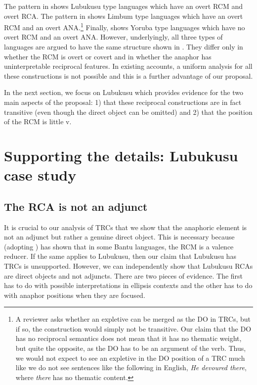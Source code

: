 \documentclass[output=paper]{langsci/langscibook}
\begin{document}
The pattern in  shows Lubukusu type languages which have an overt RCM and overt RCA. The pattern in  shows Limbum type languages which have an overt RCM and an overt ANA.\footnote{ A reviewer asks whether an expletive can be merged as the DO in TRCs, but if so, the construction would simply not be transitive. Our claim that the DO has no reciprocal semantics does not mean that it has no thematic weight, but quite the opposite, as the DO has to be an argument of the verb. Thus, we would not expect to see an expletive in the DO position of a TRC much like we do not see sentences like the following in English, \textit{He devoured there}, where \textit{there} has no thematic content.}   Finally,  shows Yoruba type languages which have no overt RCM and an overt ANA. However, underlyingly, all three types of languages are argued to have the same structure shown in . They differ only in whether the RCM is overt or covert and in whether the anaphor has uninterpretable reciprocal features.  In existing accounts, a uniform analysis for all these constructions is not possible and this is a further advantage of our proposal. 

  In the next section, we focus on Lubukusu which provides evidence for the two main aspects of the proposal: 1) that these reciprocal constructions are in fact transitive (even though the direct object can be omitted) and 2) that the position of the RCM is little v.

\section{Supporting the details: Lubukusu case study}
\subsection{The RCA is not an adjunct}

  It is crucial to our analysis of TRCs that we show that the anaphoric element is not an adjunct but rather a genuine direct object. This is necessary because \citet{Mchombo1994} (adopting \citealt{ReinhartReuland1993}) has shown that in some Bantu languages, the RCM is a valence reducer. If the same applies to Lubukusu, then our claim that Lubukusu has TRCs is unsupported. However, we can independently show that Lubukusu RCAs are direct objects and not adjuncts. There are two pieces of evidence. The first has to do with possible interpretations in ellipsis contexts and the other has to do with anaphor positions when they are focused.
\end{document}
